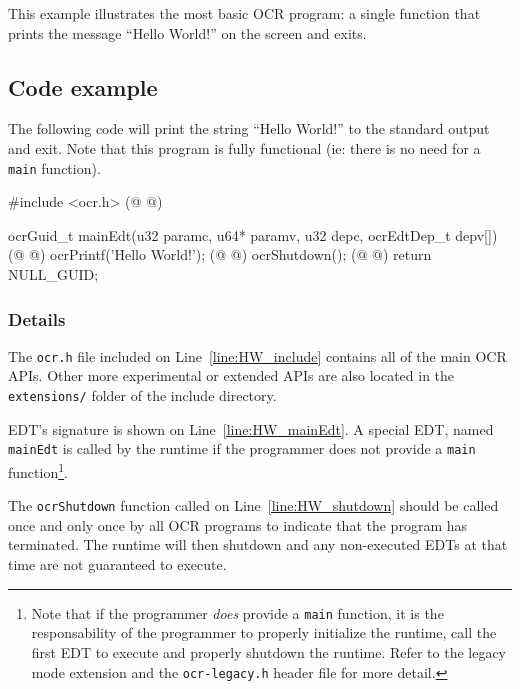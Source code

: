 This example illustrates the most basic OCR program: a single function
that prints the message ``Hello World!'' on the screen and exits.
\subsection{Code example}
The following code will print the string ``Hello World!'' to the
standard output and exit. Note that this program is fully functional
(ie: there is no need for a \texttt{main} function).

\begin{ocrsnip}
#include <ocr.h> (@ \label{line:HW_include} @)

ocrGuid_t mainEdt(u32 paramc, u64* paramv, u32 depc, ocrEdtDep_t depv[]) { (@ \label{line:HW_mainEdt} @)
    ocrPrintf('Hello World!\n'); (@ \label{line:HW_printf}@)
    ocrShutdown(); (@ \label{line:HW_shutdown}@)
    return NULL_GUID;
}
\end{ocrsnip}
\subsubsection{Details}
The \texttt{ocr.h} file included on Line~\ref{line:HW_include}
contains all of the main OCR APIs. Other more experimental or extended
APIs are also located in the \texttt{extensions/} folder of the
include directory.

EDT's signature is shown on Line~\ref{line:HW_mainEdt}. A special EDT,
named \texttt{mainEdt} is called by the runtime if the programmer does not
provide a \texttt{main} function\footnote{Note that if the programmer
  \emph{does} provide a \texttt{main} function, it is the
  responsability of the programmer to properly initialize the runtime,
  call the first EDT to execute and properly shutdown the
  runtime. Refer to the legacy mode extension and the
  \texttt{ocr-legacy.h} header file for more detail.}.

The \texttt{ocrShutdown} function called on
Line~\ref{line:HW_shutdown} should be called once and only once by all
OCR programs to indicate that the program has terminated. The runtime
will then shutdown and any non-executed EDTs at that time are not
guaranteed to execute.
